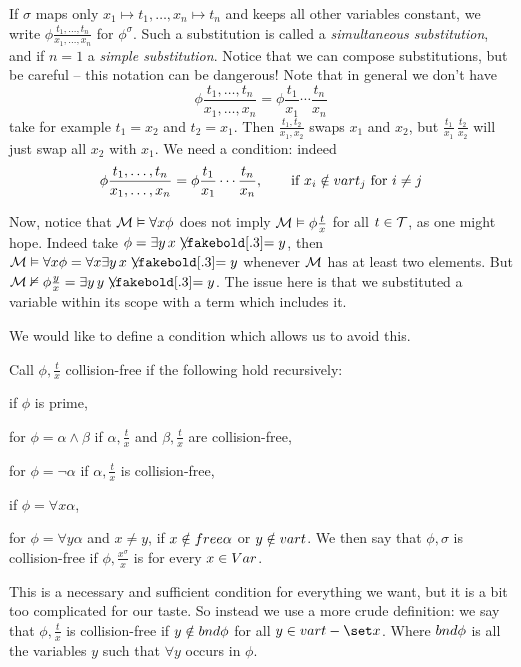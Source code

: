 If $\sigma$ maps only $x_1\mapsto t_1,\dots,x_n\mapsto t_n$ and keeps all other variables constant, we write $\phi\frac{t_1,\dots,t_n}{x_1,\dots,x_n}$ for $\phi^\sigma$.
Such a substitution is called a {\it simultaneous substitution}, and if $n=1$ a {\it simple substitution}.
Notice that we can compose substitutions, but be careful -- this notation can be dangerous!
Note that in general we don't have
$$ \phi\frac{t_1,\dots,t_n}{x_1,\dots,x_n} = \phi\frac{t_1}{x_1}\cdots\frac{t_n}{x_n} $$
take for example $t_1=x_2$ and $t_2=x_1$.
Then $\frac{t_1,t_2}{x_1,x_2}$ swaps $x_1$ and $x_2$, but $\frac{t_1}{x_1}\,\frac{t_2}{x_2}$ will just swap all $x_2$ with $x_1$.
We need a condition: indeed
$$ \phi{{t_1,\dots,t_n}\over{x_1,\dots,x_n}} = \phi{{t_1}\over{x_1}}\cdots{{t_n}\over{x_n}},\qquad \hbox{if $x_i\notin{\sl var} t_j$ for $i\neq j$} $$

Now, notice that ${\cal M}\vDash\forall x\phi$ does not imply ${\cal M}\vDash\phi{{t}\over{x}}$ for all $t\in{\cal T}$, as one might hope.
Indeed take $\phi=\exists y\,x\neqb y$, then $\c M\vDash\forall x\phi=\forall x\exists y\,x\neqb y$ whenever ${\cal M}$ has at least two elements.
But $\c M\nvDash\phi\frac yx=\exists y\,y\neqb y$.
The issue here is that we substituted a variable within its scope with a term which includes it.

We would like to define a condition which allows us to avoid this.

\bdefn

    Call $\phi,\frac tx$ {\emphcolor collision-free} if the following hold recursively:
    \benum
        \item if $\phi$ is prime,
        \item for $\phi=\alpha\land\beta$ if $\alpha,\frac tx$ and $\beta,\frac tx$ are collision-free,
        \item for $\phi=\neg\alpha$ if $\alpha,\frac tx$ is collision-free,
        \item if $\phi=\forall x\alpha$,
        \item for $\phi=\forall y\alpha$ and $x\neq y$, if $x\notin{\sl free}\alpha$ or $y\notin{\sl var} t$.
    \eenum
    We then say that $\phi,\sigma$ is {\emphcolor collision-free} if $\phi,\frac{x^\sigma}x$ is for every $x\in{\sl Var}$.

    This is a necessary and sufficient condition for everything we want, but it is a bit too complicated for our taste.
    So instead we use a more crude definition: we say that $\phi,\frac tx$ is {\emphcolor collision-free} if $y\notin{\sl bnd}\phi$ for all $y\in\var t-\set x$.
    Where ${\sl bnd}\phi$ is all the variables $y$ such that $\forall y$ occurs in $\phi$.


